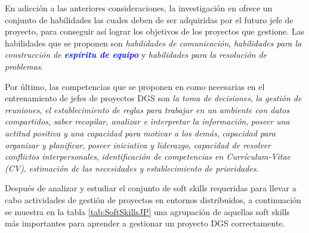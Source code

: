 En adicción a las anteriores consideraciones, la investigación en \cite{sutling2015understanding} ofrece un conjunto de habilidades las cuales deben de ser adquiridas por el futuro jefe de proyecto, para conseguir así lograr los objetivos de los proyectos que gestione. Las habilidades que se proponen son \emph{habilidades de comunicación}, \emph{habilidades para la construcción de \textbf{\textcolor{blue}{espíritu de equipo}}} y \emph{habilidades para la resolución de problemas}.

Por último, las competencias que se proponen en \cite{saldana2014skills} como necesarias en el entrenamiento de jefes de proyectos DGS son \emph{la toma de decisiones}, \emph{la gestión de reuniones}, \emph{el establecimiento de reglas para trabajar en un ambiente con datos compartidos}, \emph{saber recopilar, analizar e interpretar la información}, \emph{poseer una actitud positiva y una capacidad para motivar a los demás}, \emph{capacidad para organizar y planificar}, \emph{poseer iniciativa y liderazgo}, \emph{capacidad de resolver conflictos interpersonales}, \emph{identificación de competencias en Currículum-Vitae (CV)}, \emph{estimación de las necesidades y establecimiento de prioridades}.

Después de analizar y estudiar el conjunto de soft skills requeridas para llevar a cabo actividades de gestión de proyectos en entornos distribuidos, a continuación se muestra en la tabla \ref{tab:SoftSkillsJP} una agrupación de aquellas soft skills más importantes para aprender a gestionar un proyecto DGS correctamente.


